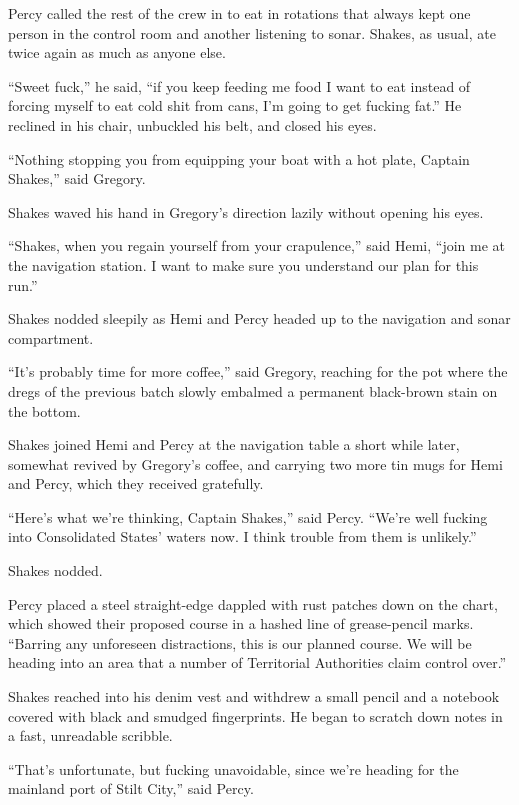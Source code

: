 \documentclass[
]{scrbook}
\begin{document}
Percy called the rest of the crew in to eat in rotations that always
kept one person in the control room and another listening to sonar.
Shakes, as usual, ate twice again as much as anyone else.

``Sweet fuck,'' he said, ``if you keep feeding me food I want to eat
instead of forcing myself to eat cold shit from cans, I'm going to get
fucking fat.'' He reclined in his chair, unbuckled his belt, and closed
his eyes.

``Nothing stopping you from equipping your boat with a hot plate,
Captain Shakes,'' said Gregory.

Shakes waved his hand in Gregory's direction lazily without opening his
eyes.

``Shakes, when you regain yourself from your crapulence,'' said Hemi,
``join me at the navigation station. I want to make sure you understand
our plan for this run.''

Shakes nodded sleepily as Hemi and Percy headed up to the navigation and
sonar compartment.

``It's probably time for more coffee,'' said Gregory, reaching for the
pot where the dregs of the previous batch slowly embalmed a permanent
black-brown stain on the bottom.

\bigskip

Shakes joined Hemi and Percy at the navigation table a short while
later, somewhat revived by Gregory's coffee, and carrying two more tin
mugs for Hemi and Percy, which they received gratefully.

``Here's what we're thinking, Captain Shakes,'' said Percy. ``We're well
fucking into Consolidated States' waters now. I think trouble from them
is unlikely.''

Shakes nodded.

Percy placed a steel straight-edge dappled with rust patches down on the
chart, which showed their proposed course in a hashed line of
grease-pencil marks. ``Barring any unforeseen distractions, this is our
planned course. We will be heading into an area that a number of
Territorial Authorities claim control over.''

Shakes reached into his denim vest and withdrew a small pencil and a
notebook covered with black and smudged fingerprints. He began to
scratch down notes in a fast, unreadable scribble.

``That's unfortunate, but fucking unavoidable, since we're heading for
the mainland port of Stilt City,'' said Percy.
\end{document}
